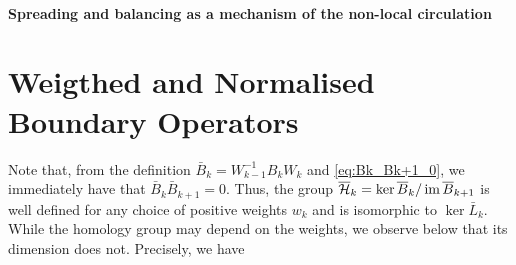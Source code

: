 
\paragraph{ Spreading and balancing as a mechanism of the non-local circulation}
















\section{ Weigthed and Normalised Boundary Operators}







Note that, from the definition \( \bar B_k= W_{k-1}^{-1} B_k W_k \) and \eqref{eq:Bk_Bk+1_0}, we immediately have that  \( \bar B_k\bar B_{k+1}=0 \). Thus, the group \( \overline{\mathcal{H}}_k = \ker \overline{B}_k / \operatorname{im} \overline{B}_{k+1} \) is well defined for any choice of positive weights  \( w_k \) and is isomorphic to \( \ker \bar L_k \). While the homology group may depend on the weights,  we observe below that its dimension does not. Precisely, we have 

